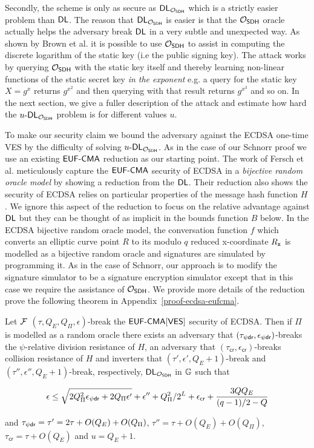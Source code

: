 Secondly, the scheme is only as secure as $\textsf{DL}_{\mathcal{O}_{\textsf{SDH}}}$ which is a strictly easier problem than $\textsf{DL}$.
The reason that $\textsf{DL}_{\mathcal{O}_{\textsf{SDH}}}$ is easier is that the $\mathcal{O}_{\textsf{SDH}}$ oracle actually helps the adversary break $\textsf{DL}$ in a very subtle and unexpected way.
As shown by Brown et al.\cite{SDHP} it is possible to use $\mathcal{O}_{\textsf{SDH}}$ to assist in computing the discrete logarithm of the static key (i.e the public signing key).
The attack works by querying $\mathcal{O}_{\textsf{SDH}}$ with the static key itself and thereby learning non-linear functions of the static secret key \emph{in the exponent} e.g. a query for the static key $X = g^x$ returns $g^{x^2}$ and then querying with that result returns $g^{x^3}$ and so on.
In the next section, we give a fuller description of the attack and estimate how hard the $u\text{-}\textsf{DL}_{\mathcal{O}_{\textsf{SDH}}}$ problem is for different values $u$.

To make our security claim we bound the adversary against the ECDSA one-time VES by the difficulty of solving $u\text{-}\textsf{DL}_{\mathcal{O}_{\textsf{SDH}}}$.
As in the case of our Schnorr proof we use an existing $\textsf{EUF-CMA}$ reduction as our starting point.
The work of Fersch et al.\cite{ecdsa-eufcma} meticulously capture the $\textsf{EUF-CMA}$ security of ECDSA in a \emph{bijective random oracle model} by showing a reduction from the $\textsf{DL}$.
Their reduction also shows the security of ECDSA relies on particular properties of the message hash function $H$.
We ignore this aspect of the reduction to focus on the relative advantage against $\textsf{DL}$ but they can be thought of as implicit in the bounds function $B$ below.
In the ECDSA bijective random oracle model, the conversation function $f$ which converts an elliptic curve point $R$ to its modulo $q$ reduced x-coordinate $R_{\mathtt{x}}$ is modelled as a bijective random oracle and signatures are simulated by programming it.
As in the case of Schnorr, our approach is to modify the signature simulator to be a signature encryption simulator except that in this case we require the assistance of $\mathcal{O}_{\textsf{SDH}}$.
We provide more details of the reduction prove the following theorem in Appendix~\ref{proof-ecdsa-eufcma}.

\begin{theorem}
  Let $\mathcal{F}$ $(\tau,Q_E,Q_\Pi,\epsilon)$-break the $\textsf{EUF-CMA}[\textsf{VES}]$ security of ECDSA.
  Then if $\Pi$ is modelled as a random oracle there exists an adversary
  that $(\tau_{\psi{}\textsf{dr}},\epsilon_{\psi{}\textsf{dr}})$-breaks the $\psi$-relative division resistance of $H$, an adversary that $(\tau_{\textsf{cr}}, \epsilon_{\textsf{cr}})$-breaks collision resistance of $H$ and inverters that $(\tau', \epsilon', Q_E + 1)$-break and $(\tau'', \epsilon'', Q_E + 1)$-break, respectively, $\textsf{DL}_{\mathcal{O}_{\textsf{SDH}}}$ in $\mathbb{G}$ such that

  \[ \epsilon \leq \sqrt{2Q_{\Pi}^2\epsilon_{\psi{}\textsf{dr}} + 2Q_{\Pi}\epsilon' } + \epsilon'' + Q_{\Pi}^2/2^L + \epsilon_{\textsf{cr}} + \frac{3QQ_E}{(q-1)/2-Q}  \]

  \hfill \break and $\tau_{\psi{}\textsf{dr}} = \tau' = 2\tau + O(Q_E) + O(Q_{\Pi})$, $\tau'' = \tau + O(Q_{E})+ O(Q_{\Pi})$, $\tau_{\textsf{cr}} = \tau + O(Q_E)$ and $u = Q_E + 1$.


\end{theorem}

